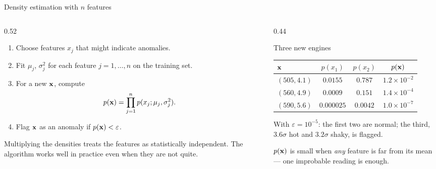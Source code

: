 \documentclass[aspectratio=169,10pt]{beamer}
\begin{document}
\begin{frame}{Density estimation with $n$ features}
  \begin{columns}[T,onlytextwidth]
    \begin{column}{0.52\textwidth}
      \begin{defnbox}
        \small
        \begin{enumerate}
          \item Choose features $x_j$ that might indicate anomalies.
          \item Fit $\mu_j$, $\sigma_j^2$ for each feature $j=1,\dots,n$ on the training set.
          \item For a new $\mathbf{x}$, compute
          \[ p(\mathbf{x})=\prod_{j=1}^{n}p(x_j;\mu_j,\sigma_j^2). \]
          \item Flag $\mathbf{x}$ as an anomaly if $p(\mathbf{x})<\varepsilon$.
        \end{enumerate}
      \end{defnbox}
      \footnotesize
      Multiplying the densities treats the features as statistically independent. The
      algorithm works well in practice even when they are not quite.
    \end{column}
    \begin{column}{0.44\textwidth}
      \footnotesize
      \begin{block}{Three new engines}
        \renewcommand{\arraystretch}{1.2}
        \begin{tabular}{@{}lccc@{}}
          \toprule
          $\mathbf{x}$ & $p(x_1)$ & $p(x_2)$ & $p(\mathbf{x})$\\
          \midrule
          $(505,4.1)$ & $0.0155$ & $0.787$ & $1.2\times10^{-2}$\\
          $(560,4.9)$ & $0.0009$ & $0.151$ & $1.4\times10^{-4}$\\
          $(590,5.6)$ & $0.000025$ & $0.0042$ & $1.0\times10^{-7}$\\
          \bottomrule
        \end{tabular}
      \end{block}
      With $\varepsilon=10^{-5}$: the first two are normal; the third, $3.6\sigma$ hot
      and $3.2\sigma$ shaky, is flagged.
      \begin{keyidea}
        $p(\mathbf{x})$ is small when \emph{any} feature is far from its mean --- one improbable
        reading is enough.
      \end{keyidea}
    \end{column}
  \end{columns}
\end{frame}
\end{document}

